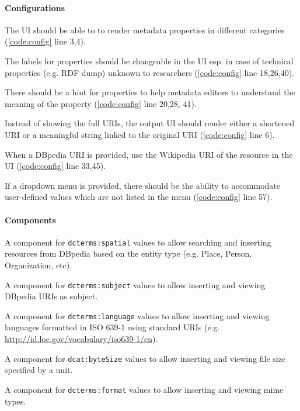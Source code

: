 \documentclass{acm_proc_article-sp}
\begin{document}
\paragraph{Configurations}
\begin{compactitem}
 \item The UI should be able to to render metadata properties in different categories (\autoref{code:config} line 3,4).
 \item The labels for properties should be changeable in the UI esp. in case of technical properties (e.g. RDF dump) unknown to researchers (\autoref{code:config} line 18,26,40).
 \item There should be a hint for properties to help metadata editors to understand the meaning of the property (\autoref{code:config} line 20,28, 41).
 \item Instead of showing the full URIs, the output UI should render either a shortened URI or a meaningful string linked to the original URI (\autoref{code:config} line 6). 
 \item When a DBpedia URI is provided, use the Wikipedia URI of the resource in the UI (\autoref{code:config} line 33,45).
 \item If a dropdown menu is provided, there should be the ability to accommodate user-defined values which are not listed in the menu (\autoref{code:config} line 57).
 
\end{compactitem}

\paragraph{Components}
\begin{compactitem}
 \item A component for \texttt{dcterms:spatial} values to allow searching and inserting resources from DBpedia based on the entity type (e.g. Place, Person, Organization, etc).
 \item A component for \texttt{dcterms:subject} values to allow inserting and viewing DBpedia URIs as subject.
 \item A component for \texttt{dcterms:language} values to allow inserting and viewing languages formatted in ISO 639-1 using standard URIs (e.g. \url{http://id.loc.gov/vocabulary/iso639-1/en}).
 \item A component for \texttt{dcat:byteSize} values to allow inserting and viewing file size specified by a unit.
  \item A component for \texttt{dcterms:format} values to allow inserting and viewing mime types.
\end{compactitem}
\end{document}
